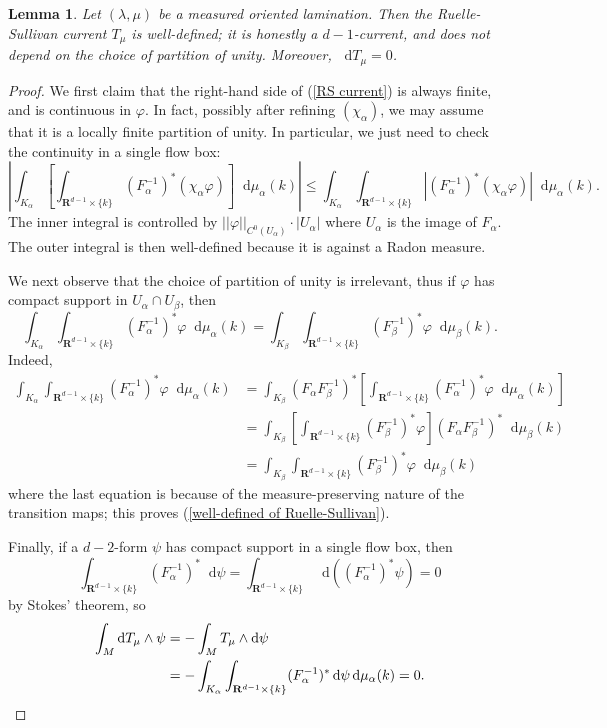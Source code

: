 \documentclass[reqno,11pt]{amsart}
\newcommand{\RR}{\mathbf{R}}
\newcommand*\dif{\mathop{}\!\mathrm{d}}
\newtheorem{lemma}[theorem]{Lemma}
\theoremstyle{definition}
\numberwithin{equation}{section}
\begin{document}
\begin{lemma}
Let $(\lambda, \mu)$ be a measured oriented lamination.
Then the Ruelle-Sullivan current $T_\mu$ is well-defined; it is honestly a $d-1$-current, and does not depend on the choice of partition of unity.
Moreover, $\dif T_\mu = 0$.
\end{lemma}
\begin{proof}
We first claim that the right-hand side of (\ref{RS current}) is always finite, and is continuous in $\varphi$.
In fact, possibly after refining $(\chi_\alpha)$, we may assume that it is a locally finite partition of unity.
In particular, we just need to check the continuity in a single flow box:
$$\left|\int_{K_\alpha} \left[\int_{\RR^{d - 1} \times \{k\}} (F_\alpha^{-1})^* (\chi_\alpha \varphi) \right] \dif \mu_\alpha(k)\right| \leq \int_{K_\alpha} \int_{\RR^{d - 1} \times \{k\}} |(F_\alpha^{-1})^* (\chi_\alpha \varphi)| \dif \mu_\alpha(k).$$
The inner integral is controlled by $||\varphi||_{C^0(U_\alpha)} \cdot |U_\alpha|$ where $U_\alpha$ is the image of $F_\alpha$.
The outer integral is then well-defined because it is against a Radon measure.

We next observe that the choice of partition of unity is irrelevant, thus if $\varphi$ has compact support in $U_\alpha \cap U_\beta$, then
\begin{equation}\label{well-defined of Ruelle-Sullivan}
\int_{K_\alpha} \int_{\RR^{d - 1} \times \{k\}} (F_\alpha^{-1})^* \varphi \dif \mu_\alpha(k) = \int_{K_\beta} \int_{\RR^{d - 1} \times \{k\}} (F_\beta^{-1})^* \varphi \dif \mu_\beta(k).
\end{equation}
Indeed,
\begin{align*}
\int_{K_\alpha} \int_{\RR^{d - 1} \times \{k\}} (F_\alpha^{-1})^* \varphi \dif \mu_\alpha(k)
&= \int_{K_\beta} (F_\alpha F_\beta^{-1})^* \left[\int_{\RR^{d - 1} \times \{k\}} (F_\alpha^{-1})^* \varphi \dif \mu_\alpha(k)\right] \\
&= \int_{K_\beta} \left[\int_{\RR^{d - 1} \times \{k\}} (F_\beta^{-1})^* \varphi\right] (F_\alpha F_\beta^{-1})^* \dif \mu_\beta(k) \\
&= \int_{K_\beta} \int_{\RR^{d - 1} \times \{k\}} (F_\beta^{-1})^* \varphi \dif \mu_\beta(k)
\end{align*}
where the last equation is because of the measure-preserving nature of the transition maps; this proves (\ref{well-defined of Ruelle-Sullivan}).

Finally, if a $d-2$-form $\psi$ has compact support in a single flow box, then
$$\int_{\RR^{d - 1} \times \{k\}} (F_\alpha^{-1})^* \dif \psi = \int_{\RR^{d - 1} \times \{k\}} \dif((F_\alpha^{-1})^* \psi) = 0$$
by Stokes' theorem, so
\begin{align*}
\int_M \dif T_\mu \wedge \psi &= -\int_M T_\mu \wedge \dif \psi \\
&= -\int_{K_\alpha} \int_{\RR^{d - 1} \times \{k\}} (F_\alpha^{-1})^* \dif \psi \dif \mu_\alpha(k) = 0. \qedhere
\end{align*}
\end{proof}
\end{document}
